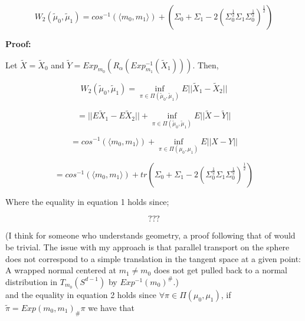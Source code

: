 \documentclass[]{article}
\begin{document}
\begin{equation*}
	W_2(\tilde{\mu}_0, \tilde{\mu}_1) =  cos^{-1}(\langle m_0,m_1\rangle) + (\Sigma_0 + \Sigma_1 - 2 (\Sigma_0^{\frac{1}{2}} \Sigma_1 \Sigma_0^{\frac{1}{2}})^{\frac{1}{2}}) 
\end{equation*} 

%


\textbf{Proof:}

Let $\tilde{X} = \tilde{X}_0$ and $\tilde{Y} = Exp_{m_0}(R_\alpha(Exp_{m_1}^{-1}(\tilde{X}_1)))$. Then,

\begin{equation*}
	W_2(\tilde{\mu}_0, \tilde{\mu}_1) =  \inf_{\pi \in \Pi(\tilde{\mu}_0, \tilde{\mu}_1)} E||\tilde{X}_1-\tilde{X}_2||  
\end{equation*}  

\begin{equation}
	 =  ||E\tilde{X}_1 - E\tilde{X}_2|| + \inf_{\pi \in \Pi(\tilde{\mu}_0, \tilde{\mu}_1)} E||\tilde{X} - \tilde{Y}||  
\end{equation}

\begin{equation}
	= cos^{-1}( \langle m_0, m_1 \rangle ) +\inf_{\pi \in \Pi({\mu}_0, {\mu}_1)} E||X-Y||
\end{equation} 

\begin{equation*}
	= cos^{-1}( \langle m_0, m_1 \rangle ) + tr(\Sigma_0 + \Sigma_1 - 2(\Sigma_0^{\frac{1}{2}}\Sigma_1\Sigma_0^{\frac{1}{2}})^{\frac{1}{2}})
\end{equation*} 

Where the equality in equation 1 holds since;

\begin{equation*}
	???
\end{equation*}

(I think for someone who understands geometry, a proof following that of \cite{https://doi.org/10.48550/arxiv.0801.2250} would be trivial. The issue with my approach is that parallel transport on the sphere does not correspond to a simple translation in the tangent space at a given point: A wrapped normal centered at $m_1 \neq m_0$ does not get pulled back to a normal distribution in $T_{m_0}(S^{d-1})$ by $Exp^{-1}(m_0)^{\#}$.)\\

and the equality in equation 2 holds since $\forall \pi \in \Pi(\mu_0, \mu_1)$, if $\tilde{\pi} = {Exp(m_0,m_1)}_\# \pi$ we have that 
\end{document}
